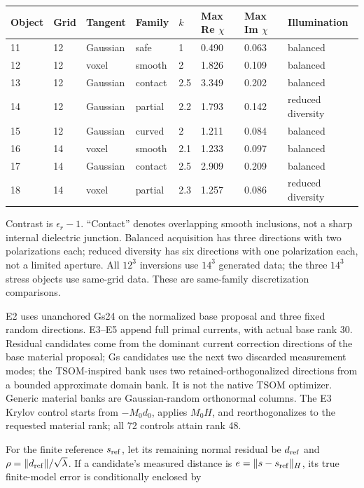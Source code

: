 \documentclass[11pt]{article}
\begin{document}
\begin{table}[tbp]\centering\footnotesize\setlength{\tabcolsep}{3pt}
\begin{tabularx}{\linewidth}{lXXXXXXX}\toprule
Object & Grid & Tangent & Family & \(k\) & Max Re \(\chi\) & Max Im \(\chi\) & Illumination \\\midrule
11 & 12 & Gaussian & safe & 1 & 0.490 & 0.063 & balanced \\
12 & 12 & voxel & smooth & 2 & 1.826 & 0.109 & balanced \\
13 & 12 & Gaussian & contact & 2.5 & 3.349 & 0.202 & balanced \\
14 & 12 & Gaussian & partial & 2.2 & 1.793 & 0.142 & reduced diversity \\
15 & 12 & Gaussian & curved & 2 & 1.211 & 0.084 & balanced \\
16 & 14 & voxel & smooth & 2.1 & 1.233 & 0.097 & balanced \\
17 & 14 & Gaussian & contact & 2.5 & 2.909 & 0.209 & balanced \\
18 & 14 & voxel & partial & 2.3 & 1.257 & 0.086 & reduced diversity \\
\bottomrule\end{tabularx}
\end{table}

Contrast is \(\epsilon_r-1\). ``Contact'' denotes overlapping smooth inclusions, not a sharp internal dielectric junction. Balanced acquisition has three directions with two polarizations each; reduced diversity has six directions with one polarization each, not a limited aperture. All \(12^3\) inversions use \(14^3\) generated data; the three \(14^3\) stress objects use same-grid data. These are same-family discretization comparisons.

E2 uses unanchored Gs24 on the normalized base proposal and three fixed random directions. E3--E5 append full primal currents, with actual base rank 30. Residual candidates come from the dominant current correction directions of the base material proposal; Gs candidates use the next two discarded measurement modes; the TSOM-inspired bank uses two retained-orthogonalized directions from a bounded approximate domain bank. It is not the native TSOM optimizer. Generic material banks are Gaussian-random orthonormal columns. The E3 Krylov control starts from \(-M_0d_0\), applies \(M_0H\), and reorthogonalizes to the requested material rank; all 72 controls attain rank 48.

For the finite reference \(s_{\rm ref}\), let its remaining normal residual be \(d_{\rm ref}\) and \(\rho=\|d_{\rm ref}\|/\sqrt\lambda\). If a candidate's measured distance is \(e=\|s-s_{\rm ref}\|_H\), its true finite-model error is conditionally enclosed by
\end{document}
